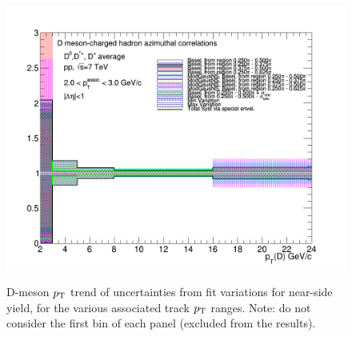 \begin{figure}[!htbp]
{\includegraphics[width=0.48\linewidth, height=0.33\linewidth]{figures/FitOutput/BaselineSystematicSourcesNSYield_pthad2to3.png}}
\caption{D-meson $p_{\rm T}$ trend of uncertainties from fit variations for near-side yield, for the various associated track $p_{\rm T}$ ranges. Note: do not consider the first bin of each panel (excluded from the results).}
\label{fig:NSyieldUnc}
\end{figure}
